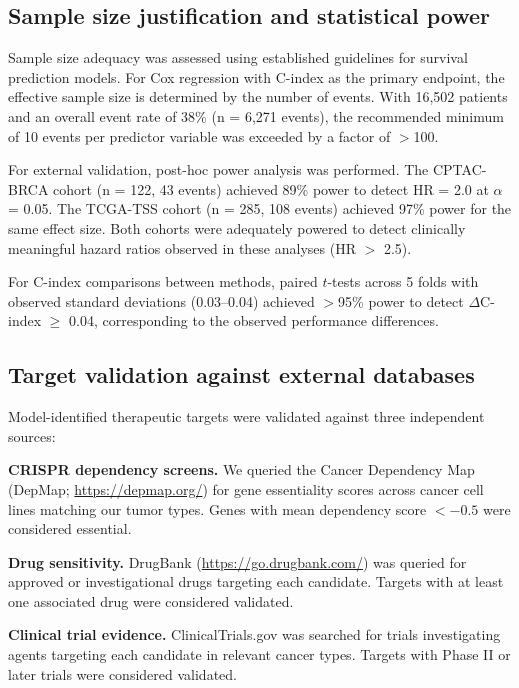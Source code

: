 \documentclass[pdflatex,sn-nature]{sn-jnl}%
\theoremstyle{thmstyleone}%
\theoremstyle{thmstyletwo}%
\theoremstyle{thmstylethree}%
\begin{document}
\subsection{Sample size justification and statistical power}

Sample size adequacy was assessed using established guidelines for survival prediction models\cite{bib76}. For Cox regression with C-index as the primary endpoint, the effective sample size is determined by the number of events. With 16,502 patients and an overall event rate of 38\% (n = 6,271 events), the recommended minimum of 10 events per predictor variable was exceeded by a factor of $>$100.

For external validation, post-hoc power analysis was performed. The CPTAC-BRCA cohort (n = 122, 43 events) achieved 89\% power to detect HR = 2.0 at $\alpha$ = 0.05. The TCGA-TSS cohort (n = 285, 108 events) achieved 97\% power for the same effect size. Both cohorts were adequately powered to detect clinically meaningful hazard ratios observed in these analyses (HR $>$ 2.5).

For C-index comparisons between methods, paired $t$-tests across 5 folds with observed standard deviations (0.03--0.04) achieved $>$95\% power to detect $\Delta$C-index $\geq$ 0.04, corresponding to the observed performance differences.

\subsection{Target validation against external databases}

Model-identified therapeutic targets were validated against three independent sources:

\textbf{CRISPR dependency screens.} We queried the Cancer Dependency Map (DepMap; \url{https://depmap.org/})\cite{bib19} for gene essentiality scores across cancer cell lines matching our tumor types. Genes with mean dependency score $< -0.5$ were considered essential.

\textbf{Drug sensitivity.} DrugBank (\url{https://go.drugbank.com/}) was queried for approved or investigational drugs targeting each candidate. Targets with at least one associated drug were considered validated.

\textbf{Clinical trial evidence.} ClinicalTrials.gov was searched for trials investigating agents targeting each candidate in relevant cancer types. Targets with Phase II or later trials were considered validated.
\end{document}
